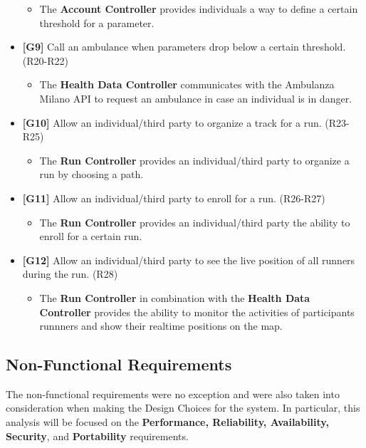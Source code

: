 \documentclass[12pt]{article}
\begin{document}
\begin{itemize}
\begin{itemize}
            \item The \textbf{Account Controller} provides individuals a way to define a certain threshold for a parameter.
        \end{itemize}
  \item \textbf{[G9]} Call an ambulance when parameters drop below a certain threshold. (R20-R22)
        \begin{itemize}
            \item The \textbf{Health Data Controller} communicates with the Ambulanza Milano API to request an ambulance in case an individual is in danger.
        \end{itemize}
  \item \textbf{[G10]} Allow an individual/third party to organize a track for a run. (R23-R25)
        \begin{itemize}
            \item The \textbf{Run Controller} provides an individual/third party to organize a run by choosing a path.
        \end{itemize}
  \item \textbf{[G11]} Allow an individual/third party to enroll for a run. (R26-R27)
        \begin{itemize}
            \item The \textbf{Run Controller} provides an individual/third party the ability to enroll for a certain run.
        \end{itemize}
  \item \textbf{[G12]} Allow an individual/third party to see the live position of all runners during the run. (R28)
        \begin{itemize}
            \item The \textbf{Run Controller} in combination with the \textbf{Health Data Controller} provides the ability to monitor the activities of participants runnners and show their realtime positions on the map.
        \end{itemize}
        
        
\end{itemize}

\subsection{Non-Functional Requirements}

The non-functional requirements were no exception and were also taken into consideration when making the Design Choices for the system. In particular, this analysis will be focused on the \textbf{Performance, Reliability, Availability, Security}, and \textbf{Portability} requirements.
\end{document}
